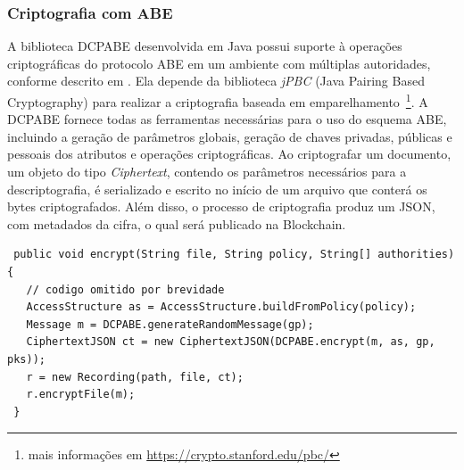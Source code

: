 \documentclass[a4paper,11pt]{article}
\begin{document}
\subsubsection{Criptografia com ABE}


A biblioteca DCPABE desenvolvida em Java possui suporte à operações criptográficas do protocolo ABE em um ambiente com múltiplas autoridades, conforme descrito em \cite{Lewko2011}. Ela depende da biblioteca \emph{jPBC} (Java Pairing Based Cryptography) %
para realizar a criptografia baseada em emparelhamento~\footnote{mais informações em \href{https://crypto.stanford.edu/pbc/}{https://crypto.stanford.edu/pbc/}}. %
A DCPABE fornece todas as ferramentas necessárias para o uso do esquema ABE, incluindo a geração de parâmetros globais, geração de chaves privadas, públicas e pessoais dos atributos e operações criptográficas. %
Ao criptografar um documento, um objeto do tipo \emph{Ciphertext}, contendo os parâmetros necessários para a descriptografia, é serializado e escrito no início de um arquivo que conterá os bytes criptografados. {\color{blue}Além disso, o processo de criptografia produz um JSON, com metadados da cifra, o qual será publicado na Blockchain}.



\begin{lstlisting}
 public void encrypt(String file, String policy, String[] authorities) {
   // codigo omitido por brevidade
   AccessStructure as = AccessStructure.buildFromPolicy(policy);
   Message m = DCPABE.generateRandomMessage(gp);
   CiphertextJSON ct = new CiphertextJSON(DCPABE.encrypt(m, as, gp, pks));
   r = new Recording(path, file, ct);
   r.encryptFile(m);
 }
\end{lstlisting}
\end{document}
